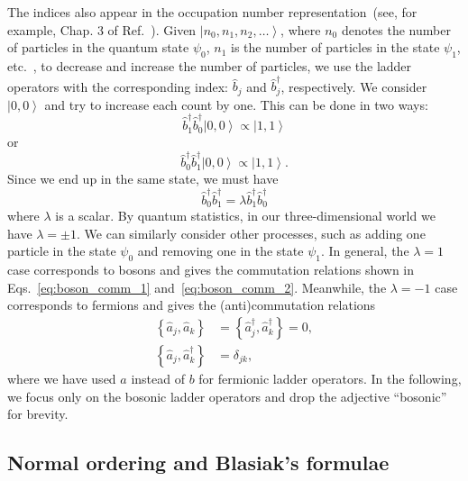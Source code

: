 \documentclass[5p, twocolumn, 10pt, sort&compress]{elsarticle}
\newcommand{\ket}[1]{\left|{#1}\right\rangle}
\newcommand{\acomm}[2]{\left\{{#1},{#2}\right\}}
\newcommand{\bop}{\hat{b}}
\newcommand{\bdag}{\bop^\dagger}
\begin{document}
The indices also appear in the occupation number representation~(see, for example, Chap. 3 of Ref.~\cite{lancaster_quantum_2014}). Given $\ket{n_0,n_1,n_2,\dots}$, where $n_0$ denotes the number of particles in the quantum state $\psi_0$, $n_1$ is the number of particles in the state $\psi_1$, etc.~\cite{lancaster_quantum_2014}, to decrease and increase the number of particles, we use the ladder operators with the corresponding index: $\bop_j$ and $\bdag_j$, respectively.  We consider $\ket{0,0}$ and try to increase each count by one.  This can be done in two ways:
\begin{equation}
    \bdag_1\bdag_0\ket{0,0}\propto\ket{1,1}
\end{equation}
or
\begin{equation}
    \bdag_0\bdag_1\ket{0,0}\propto\ket{1,1}.
\end{equation}
Since we end up in the same state, we must have
\begin{equation}
    \bdag_0\bdag_1=\lambda\bdag_1\bdag_0
\end{equation}
where $\lambda$ is a scalar.  By quantum statistics, in our three-dimensional world we have $\lambda=\pm 1$.  We can similarly consider other processes, such as adding one particle in the state $\psi_0$ and removing one in the state $\psi_1$.  In general, the $\lambda=1$ case corresponds to bosons and gives the commutation relations shown in Eqs.~\eqref{eq:boson_comm_1} and~\eqref{eq:boson_comm_2}.  Meanwhile, the $\lambda=-1$ case corresponds to fermions and gives the (anti)commutation relations
\begin{subequations}
\begin{align}
    \acomm{\hat{a}_j}{\hat{a}_k} &= \acomm{\hat{a}_j^\dagger}{\hat{a}_k^\dagger} = 0,
    \\
    \acomm{\hat{a}_j}{\hat{a}_k^\dagger} &= \delta_{jk},
\end{align}
\end{subequations}
where we have used $a$ instead of $b$ for fermionic ladder operators. 
 In the following, we focus only on the bosonic ladder operators and drop the adjective ``bosonic'' for brevity. 


\subsection{Normal ordering and Blasiak's formulae}\label{subsec:normal_ordering}
\end{document}
